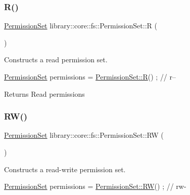 \subsubsection{\texorpdfstring{R()}{R()}}
{\footnotesize\ttfamily \hyperlink{classlibrary_1_1core_1_1fs_1_1_permission_set}{Permission\+Set} library\+::core\+::fs\+::\+Permission\+Set\+::R (\begin{DoxyParamCaption}{ }\end{DoxyParamCaption})\hspace{0.3cm}{\ttfamily [static]}}



Constructs a read permission set. 


\begin{DoxyCode}
\hyperlink{classlibrary_1_1core_1_1fs_1_1_permission_set_a8a6eb39cc2a8bca92a657d065d3e36ba}{PermissionSet} permissions = \hyperlink{classlibrary_1_1core_1_1fs_1_1_permission_set_a3e14cd99abd197736da0ab7880b1fbec}{PermissionSet::R}() ; \textcolor{comment}{// r--}
\end{DoxyCode}


\begin{DoxyReturn}{Returns}
Read permissions 
\end{DoxyReturn}
\mbox{\label{classlibrary_1_1core_1_1fs_1_1_permission_set_aed46e87c4c521dd37d7f276d8ca87955}} 
\subsubsection{\texorpdfstring{R\+W()}{RW()}}
{\footnotesize\ttfamily \hyperlink{classlibrary_1_1core_1_1fs_1_1_permission_set}{Permission\+Set} library\+::core\+::fs\+::\+Permission\+Set\+::\+RW (\begin{DoxyParamCaption}{ }\end{DoxyParamCaption})\hspace{0.3cm}{\ttfamily [static]}}



Constructs a read-\/write permission set. 


\begin{DoxyCode}
\hyperlink{classlibrary_1_1core_1_1fs_1_1_permission_set_a8a6eb39cc2a8bca92a657d065d3e36ba}{PermissionSet} permissions = \hyperlink{classlibrary_1_1core_1_1fs_1_1_permission_set_aed46e87c4c521dd37d7f276d8ca87955}{PermissionSet::RW}() ; \textcolor{comment}{// rw-}
\end{DoxyCode}


